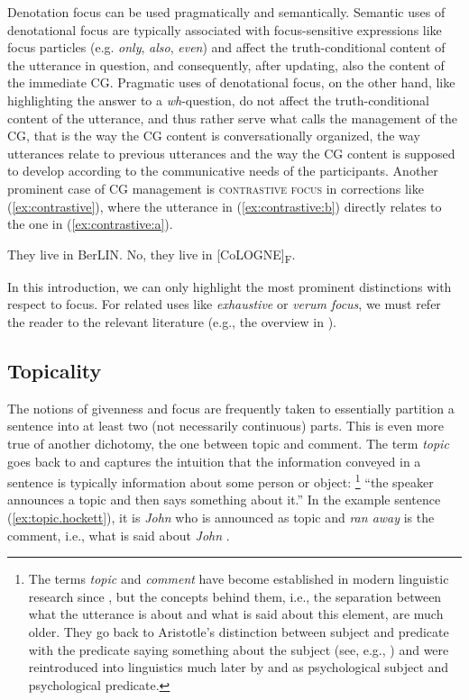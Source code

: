 \documentclass[output=paper,colorlinks,citecolor=brown]{langscibook}
\begin{document}
Denotation focus can be used pragmatically and semantically. Semantic uses of denotational focus are typically associated with focus-sensitive expressions like focus particles (e.g. \textit{only}, \textit{also}, \textit{even}) and affect the truth-conditional content of the utterance in question, and consequently, after updating, also the content of the immediate CG. Pragmatic uses of denotational focus, on the other hand, like highlighting the answer to a \textit{wh}-question, do not affect the truth-conditional content of the utterance, and thus rather serve what \citet{krifka2007} calls the management of the CG, that is the way the CG content is conversationally organized, the way utterances relate to previous utterances and the way the CG content is supposed to develop according to the communicative needs of the participants. Another prominent case of CG management is \textsc{contrastive focus} in corrections like (\ref{ex:contrastive}), where the utterance in (\ref{ex:contrastive:b}) directly relates to the one in (\ref{ex:contrastive:a}).  

\ea\label{ex:contrastive}
    \ea They live in BerLIN.\label{ex:contrastive:a}
    \ex No, they live in [CoLOGNE]\textsubscript{F}.\label{ex:contrastive:b}
    \z
\z

In this introduction, we can only highlight the most prominent distinctions with respect to focus. For related uses like \textit{exhaustive} or \textit{verum focus}, we must refer the reader to the relevant literature (e.g., the overview in \citealt{krifka2007}). 


\subsection{Topicality}\label{Intro:Sec:Topicality}
The notions of givenness and focus are frequently taken to essentially partition a sentence into at least two (not necessarily continuous) parts. This is even more true of another dichotomy, the one between topic and comment. The term \textit{topic} goes back to \citet[201]{hockett1958} and captures the intuition that the information conveyed in a sentence is typically information about some person or object:%
\footnote{The terms \textit{topic} and \textit{comment} have become established in modern linguistic research since \citet{hockett1958}, but the concepts behind them, i.e., the separation between what the utterance is about and what is said about this element, are much older.
They go back to Aristotle's distinction between subject and predicate with the predicate saying something about the subject (see, e.g., \citealt{lambrecht1994}) and were reintroduced into linguistics much later by \citet{gabelentz1868} and \citet{paul1919} as psychological subject and psychological predicate.}
% 
``the speaker announces a topic and then says something about it.''
In the example sentence (\ref{ex:topic.hockett}), it is \textit{John} who is announced as topic and \textit{ran away} is the comment, i.e., what is said about \textit{John} \citep[201]{hockett1958}.
\end{document}
